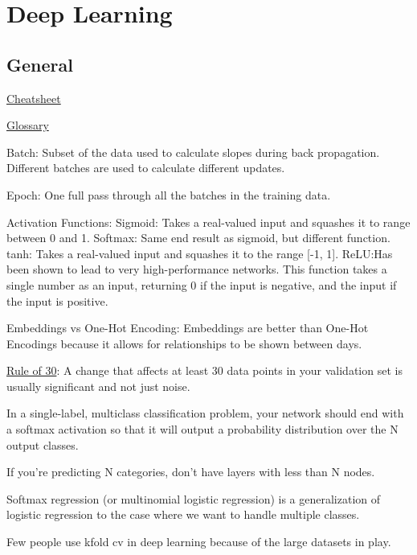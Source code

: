 \documentclass[]{book}
\begin{document}
\hypertarget{deep-learning}{%
\chapter{Deep Learning}\label{deep-learning}}

\hypertarget{general-8}{%
\section{General}\label{general-8}}

\href{https://stanford.edu/~shervine/teaching/cs-229/cheatsheet-deep-learning}{Cheatsheet}

\href{http://www.wildml.com/deep-learning-glossary/}{Glossary}

Batch: Subset of the data used to calculate slopes during back propagation. Different batches are used to calculate different updates.

Epoch: One full pass through all the batches in the training data.

Activation Functions: Sigmoid: Takes a real-valued input and squashes it to range between 0 and 1. Softmax: Same end result as sigmoid, but different function. tanh: Takes a real-valued input and squashes it to the range {[}-1, 1{]}. ReLU:Has been shown to lead to very high-performance networks. This function takes a single number as an input, returning 0 if the input is negative, and the input if the input is positive.

Embeddings vs One-Hot Encoding: Embeddings are better than One-Hot Encodings because it allows for relationships to be shown between days.

\href{https://www.youtube.com/watch?v=nqEYVzJLR_c\&feature=youtu.be\&t=31}{Rule of 30}: A change that affects at least 30 data points in your validation set is usually significant and not just noise.

In a single-label, multiclass classification problem, your network should end with a softmax activation so that it will output a probability distribution over the N output classes.

If you're predicting N categories, don't have layers with less than N nodes.

Softmax regression (or multinomial logistic regression) is a generalization of logistic regression to the case where we want to handle multiple classes.

Few people use kfold cv in deep learning because of the large datasets in play.
\end{document}

